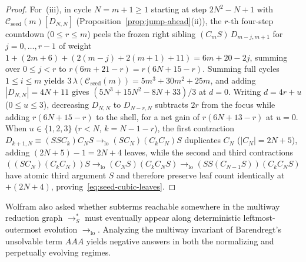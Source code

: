 \documentclass[11pt,reqno]{amsart}
\numberwithin{equation}{section}
\theoremstyle{plain}
\theoremstyle{definition}
\theoremstyle{remark}
\newcommand{\redSs}{\to_S^*}
\begin{document}
\begin{proof}
For~(iii), in cycle $N = m + 1 \ge 1$ starting at step $2N^2 - N + 1$ with $\mathcal{C}_{\mathrm{seed}}(m)[D_{N,N}]$ (Proposition~\ref{prop:jump-ahead}(ii)), the $r$-th four-step countdown ($0 \le r \le m$) peels the frozen right sibling $(C_m S)\,D_{m-j, m+1}$ for $j = 0, \dots, r - 1$ of weight $1 + (2m + 6) + (2(m - j) + 2(m + 1) + 11) = 6m + 20 - 2j$, summing over $0 \le j < r$ to $r(6m + 21 - r) = r(6N + 15 - r)$. Summing full cycles $1 \le i \le m$ yields $3\,\lambda(\mathcal{C}_{\mathrm{seed}}(m)) = 5m^3 + 30m^2 + 25m$, and adding $|D_{N,N}| = 4N + 11$ gives $(5N^3 + 15N^2 - 8N + 33)/3$ at $d = 0$. Writing $d = 4r + u$ ($0 \le u \le 3$), decreasing $D_{N,N}$ to $D_{N-r, N}$ subtracts $2r$ from the focus while adding $r(6N + 15 - r)$ to the shell, for a net gain of $r(6N + 13 - r)$ at $u = 0$. When $u \in \{1, 2, 3\}$ ($r < N$, $k = N - 1 - r$), the first contraction $D_{k+1, N} \equiv (S S C_k) C_N S \to_{\mathrm{lo}} (S C_N)(C_k C_N) S$ duplicates $C_N$ ($|C_N| = 2N + 5$), adding $(2N + 5) - 1 = 2N + 4$ leaves, while the second and third contractions $((S C_N)(C_k C_N)) S \to_{\mathrm{lo}} (C_N S)(C_k C_N S) \to_{\mathrm{lo}} (S S (C_{N-1} S))(C_k C_N S)$ have atomic third argument $S$ and therefore preserve leaf count identically at $+(2N + 4)$, proving~\eqref{eq:seed-cubic-leaves}.
\end{proof}

Wolfram also asked whether subterms reachable somewhere in the multiway reduction graph $\redSs$ must eventually appear along deterministic leftmost-outermost evolution $\to_{\mathrm{lo}}$. Analyzing the multiway invariant of Barendregt's unsolvable term $A A A$ yields negative answers in both the normalizing and perpetually evolving regimes.
\end{document}
